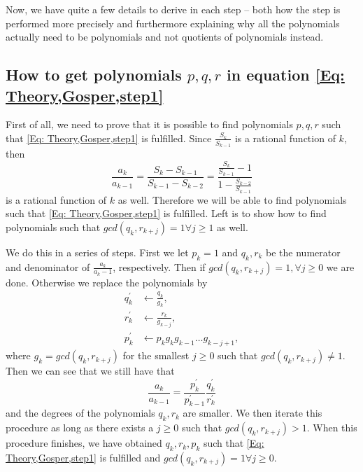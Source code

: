 Now, we have quite a few details to derive in each step -- both how the step is performed more precisely and furthermore explaining why all the polynomials actually need to be polynomials and not quotients of polynomials instead.

\subsection{How to get polynomials $p,q,r$ in equation \eqref{Eq: Theory,Gosper,step1}}\label{Sub: pqr}
First of all, we need to prove that it is possible to find polynomials $p,q,r$ such that \eqref{Eq: Theory,Gosper,step1} is fulfilled. Since $\frac{S_k}{S_{k-1}}$ is a rational function of $k$, then
\begin{equation}
  \frac{a_k}{a_{k-1}}=\frac{S_k-S_{k-1}}{S_{k-1}-S_{k-2}}=\frac{\frac{S_k}{S_{k-1}}-1}{1-\frac{S_{k-2}}{S_{k-1}}}
\end{equation}
is a rational function of $k$ as well. Therefore we will be able to find polynomials such that \eqref{Eq: Theory,Gosper,step1} is fulfilled. Left is to show how to find polynomials such that $gcd(q_k,r_{k+j})=1 \forall j\geq 1$ as well.

We do this in a series of steps. First we let $p_k=1$ and $q_k, r_k$ be the numerator and denominator of $\frac{a_k}{a_k-1}$, respectively. Then if $gcd(q_k,r_{k+j})=1, \forall j\geq 0$ we are done. Otherwise we replace the polynomials by
\begin{equation}
  \begin{split}
    q_k^\prime & \leftarrow \frac{q_k}{g_k}, \\
    r_k^\prime & \leftarrow \frac{r_k}{g_{k-j}}, \\
    p_k^\prime & \leftarrow p_kg_kg_{k-1}\ldots g_{k-j+1},
  \end{split}
\end{equation}
where $g_k=gcd(q_k,r_{k+j})$ for the smallest $j\geq 0$ such that $gcd(q_k,r_{k+j})\neq 1$. Then we can see that we still have that
\begin{equation}
  \frac{a_k}{a_{k-1}} = \frac{p_k^\prime}{p_{k-1}^\prime}\frac{q_k^\prime}{r_k^\prime}
\end{equation}
and the degrees of the polynomials $q_k, r_k$ are smaller. We then iterate this procedure as long as there exists a $j\geq 0$ such that $gcd(q_k,r_{k+j})>1$. When this procedure finishes, we have obtained $q_k,r_k,p_k$ such that \eqref{Eq: Theory,Gosper,step1} is fulfilled and $gcd(q_k,r_{k+j})=1 \forall j\geq 0$.

